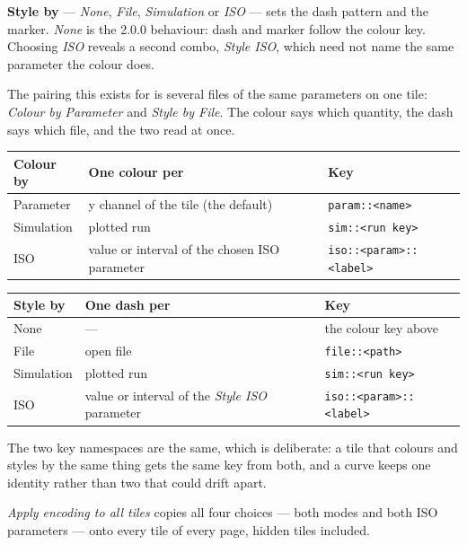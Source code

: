 \documentclass[11pt,a4paper,oneside]{report}
\newcommand{\code}[1]{\texttt{#1}}
\begin{document}
\textbf{Style by} --- \emph{None}, \emph{File}, \emph{Simulation} or \emph{ISO}
--- sets the dash pattern and the marker. \emph{None} is the 2.0.0 behaviour:
dash and marker follow the colour key. Choosing \emph{ISO} reveals a second
combo, \emph{Style ISO}, which need not name the same parameter the colour does.

The pairing this exists for is several files of the same parameters on one tile:
\emph{Colour by Parameter} and \emph{Style by File}. The colour says which
quantity, the dash says which file, and the two read at once.

\begin{center}
\small
\begin{tabular}{@{}lp{}p{}@{}}
\toprule
\textbf{Colour by} & \textbf{One colour per} & \textbf{Key} \\
\midrule
Parameter & y channel of the tile (the default) & \code{param::<name>} \\
Simulation & plotted run & \code{sim::<run key>} \\
ISO & value or interval of the chosen ISO parameter & \code{iso::<param>::<label>} \\
\bottomrule
\end{tabular}

\vspace{8pt}

\begin{tabular}{@{}lp{}p{}@{}}
\toprule
\textbf{Style by} & \textbf{One dash per} & \textbf{Key} \\
\midrule
None & --- & the colour key above \\
File & open file & \code{file::<path>} \\
Simulation & plotted run & \code{sim::<run key>} \\
ISO & value or interval of the \emph{Style ISO} parameter & \code{iso::<param>::<label>} \\
\bottomrule
\end{tabular}
\end{center}

The two key namespaces are the same, which is deliberate: a tile that colours and
styles by the same thing gets the same key from both, and a curve keeps one
identity rather than two that could drift apart.

\emph{Apply encoding to all tiles} copies all four choices --- both modes and
both ISO parameters --- onto every tile of every page, hidden tiles included.
\end{document}
